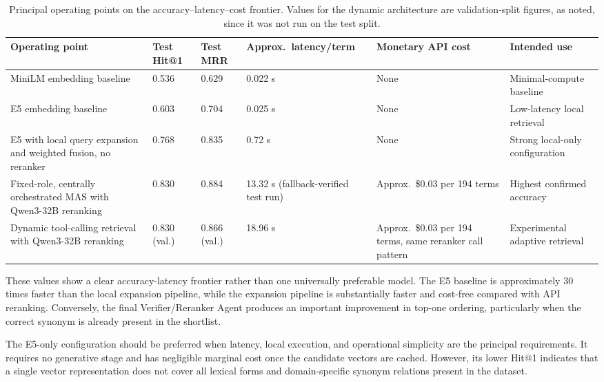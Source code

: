 \begingroup
\footnotesize
\begin{table}[htbp]
\centering
\setlength{\tabcolsep}{3pt}
\begin{tabular}{p{3.0cm}p{1.1cm}p{1.1cm}p{2.2cm}p{2.6cm}p{2.6cm}}
\toprule
\textbf{Operating point} & \textbf{Test Hit@1} & \textbf{Test MRR} & \textbf{Approx.\ latency/term} & \textbf{Monetary API cost} & \textbf{Intended use}\\
\midrule
MiniLM embedding baseline & 0.536 & 0.629 & 0.022 s & None & Minimal-compute baseline\\
E5 embedding baseline & 0.603 & 0.704 & 0.025 s & None & Low-latency local retrieval\\
E5 with local query expansion and weighted fusion, no reranker & 0.768 & 0.835 & 0.72 s & None & Strong local-only configuration\\
Fixed-role, centrally orchestrated MAS with Qwen3-32B reranking & 0.830 & 0.884 & 13.32 s (fallback-verified test run) & Approx.\ \$0.03 per 194 terms & Highest confirmed accuracy\\
Dynamic tool-calling retrieval with Qwen3-32B reranking & 0.830 (val.) & 0.866 (val.) & 18.96 s & Approx.\ \$0.03 per 194 terms, same reranker call pattern & Experimental adaptive retrieval\\
\bottomrule
\end{tabular}
\caption{Principal operating points on the accuracy--latency--cost frontier. Values for the dynamic architecture are validation-split figures, as noted, since it was not run on the test split.}
\label{tab:tradeoffs}
\end{table}
\endgroup

These values show a clear accuracy-latency frontier rather than one universally preferable model. The E5 baseline is approximately 30 times faster than the local expansion pipeline, while the expansion pipeline is substantially faster and cost-free compared with API reranking. Conversely, the final Verifier/Reranker Agent produces an important improvement in top-one ordering, particularly when the correct synonym is already present in the shortlist.

The E5-only configuration should be preferred when latency, local execution, and operational simplicity are the principal requirements. It requires no generative stage and has negligible marginal cost once the candidate vectors are cached. However, its lower Hit@1 indicates that a single vector representation does not cover all lexical forms and domain-specific synonym relations present in the dataset.

